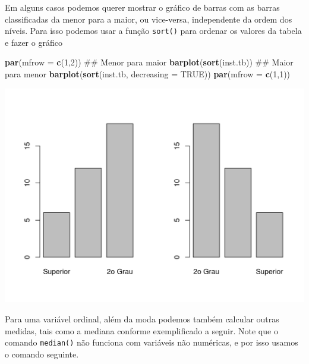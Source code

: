 \documentclass[10pt,a4paper]{book}
\newenvironment{Shaded}{\begin{snugshade}}{\end{snugshade}}
\newcommand{\KeywordTok}[1]{\textcolor[rgb]{0.13,0.29,0.53}{\textbf{#1}}}
\newcommand{\DataTypeTok}[1]{\textcolor[rgb]{0.13,0.29,0.53}{#1}}
\newcommand{\DecValTok}[1]{\textcolor[rgb]{0.00,0.00,0.81}{#1}}
\newcommand{\OtherTok}[1]{\textcolor[rgb]{0.56,0.35,0.01}{#1}}
\newcommand{\NormalTok}[1]{#1}
\begin{document}
Em alguns casos podemos querer mostrar o gráfico de barras com as barras
classificadas da menor para a maior, ou vice-versa, independente da
ordem dos níveis. Para isso podemos usar a função \texttt{sort()} para
ordenar os valores da tabela e fazer o gráfico

\begin{Shaded}
\begin{Highlighting}[]
\KeywordTok{par}\NormalTok{(}\DataTypeTok{mfrow =} \KeywordTok{c}\NormalTok{(}\DecValTok{1}\NormalTok{,}\DecValTok{2}\NormalTok{))}
\NormalTok{## Menor para maior}
\KeywordTok{barplot}\NormalTok{(}\KeywordTok{sort}\NormalTok{(inst.tb))}
\NormalTok{## Maior para menor}
\KeywordTok{barplot}\NormalTok{(}\KeywordTok{sort}\NormalTok{(inst.tb, }\DataTypeTok{decreasing =} \OtherTok{TRUE}\NormalTok{))}
\KeywordTok{par}\NormalTok{(}\DataTypeTok{mfrow =} \KeywordTok{c}\NormalTok{(}\DecValTok{1}\NormalTok{,}\DecValTok{1}\NormalTok{))}
\end{Highlighting}
\end{Shaded}

\begin{center}\includegraphics{figures/unnamed-chunk-296-1} \end{center}

Para uma variável ordinal, além da moda podemos também calcular outras
medidas, tais como a mediana conforme exemplificado a seguir. Note que o
comando \texttt{median()} não funciona com variáveis não numéricas, e
por isso usamos o comando seguinte.
\end{document}
